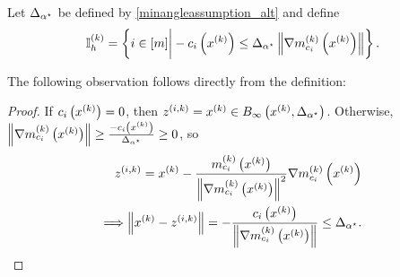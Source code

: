 Let ${\Delta_{\alpha^{\star}}}$ be defined by \cref{minangleassumption_alt} and define
\begin{align}
{ \mathbb I_h^{(k)} } = \left\{i \in [m] \bigg| -c_i\left(x^{(k)}\right) \le {\Delta_{\alpha^{\star}}} \left\|{\nabla m_{c_i}^{(k)}\left(x^{(k)}\right)}\right\| \right\}. \label{define_activeindicesk}
\end{align}



The following observation follows directly from the definition:
\begin{proof}

If $c_i\left(x^{(k)}\right) = 0$, then ${z^{(i, k)}} = x^{(k)} \in B_{\infty}\left(x^{(k)}, {\Delta_{\alpha^{\star}}} \right)$.
Otherwise, $\left\|{\nabla m_{c_i}^{(k)}\left(x^{(k)}\right)}\right\| \ge \frac{-c_i\left(x^{(k)}\right)}{{\Delta_{\alpha^{\star}}}} \ge 0$, so
\begin{align*}
{z^{(i, k)}} = x^{(k)} - \frac{m^{(k)}_{c_i}\left(x^{(k)}\right)}{\left\|{\nabla m_{c_i}^{(k)}\left(x^{(k)}\right)}\right\|^2} {\nabla m_{c_i}^{(k)}\left(x^{(k)}\right)} \\
\Longrightarrow \left\|x^{(k)} - {z^{(i, k)}} \right\|= -\frac{c_i\left(x^{(k)}\right)}{\left\|{\nabla m_{c_i}^{(k)}\left(x^{(k)}\right)}\right\|} \le {\Delta_{\alpha^{\star}}}.
\end{align*}
\end{proof}

